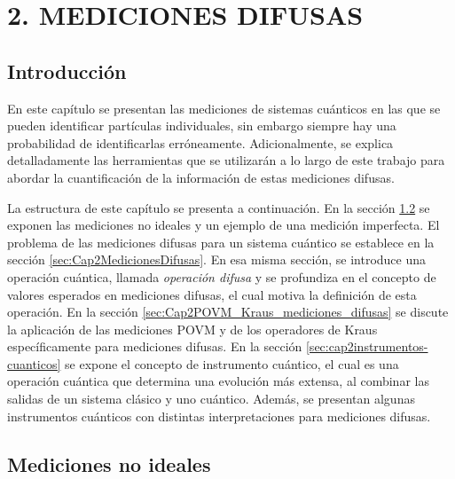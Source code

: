 \chapter[MEDICIONES DIFUSAS ]{2. MEDICIONES DIFUSAS}
\section{Introducción} %
    En este capítulo se presentan las mediciones de sistemas cuánticos en las que se pueden identificar partículas individuales, sin embargo siempre hay una probabilidad de identificarlas erróneamente.  Adicionalmente, se explica detalladamente las herramientas que se utilizarán a lo largo de este trabajo para abordar la cuantificación de la información de estas mediciones difusas.

    La estructura de este capítulo se presenta a continuación. En la sección {\ref{sec:cap2MedicionesNoIdeales}} se exponen las mediciones no ideales y un ejemplo de una medición imperfecta. El problema de las mediciones difusas para un sistema cuántico se establece en la sección {\ref{sec:Cap2MedicionesDifusas}}. En esa misma sección, se introduce una operación cuántica, llamada \textit{operación difusa} y se profundiza en el concepto de valores esperados en mediciones difusas, el cual motiva la definición de esta operación. En la sección {\ref{sec:Cap2POVM_Kraus_mediciones_difusas}} se discute la aplicación de las mediciones POVM y de los operadores de Kraus específicamente para mediciones difusas. En  la sección {\ref{sec:cap2instrumentos-cuanticos}} se expone el concepto de instrumento cuántico, el cual es una operación cuántica que determina una evolución más extensa, al combinar las salidas de un sistema clásico y uno cuántico. Además,  se presentan algunas instrumentos cuánticos con distintas interpretaciones para mediciones difusas.

\section{Mediciones no ideales}\label{sec:cap2MedicionesNoIdeales} %

